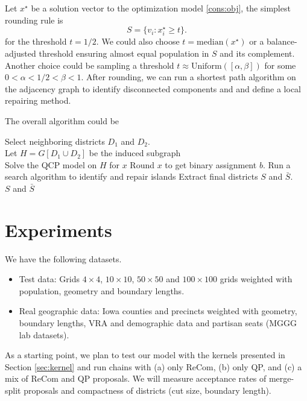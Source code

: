 \documentclass[11pt]{article}
\begin{document}
Let $x^\star$ be a solution vector to the optimization model \eqref{cons:obj}, the simplest rounding rule is
\[
    S = \{v_i : x^\star_i \ge t\}.
\]
for the threshold $t = 1/2$. We could also choose $t = \mathrm{median}(x^\star)$ or a balance-adjusted threshold ensuring almost equal population in $S$ and its complement. Another choice could be sampling a threshold $t \approx \text{Uniform}([\alpha, \beta])$ for some $0 < \alpha < 1/2 < \beta < 1$. After rounding, we can run a shortest path algorithm on the adjacency graph to identify disconnected components and and define a local repairing method.

The overall algorithm could be
\begin{algorithm}
\LinesNumbered
\caption{Outline of the Algorithm}\label{alg:overview}

\KwIn{}
\KwOut{}
\BlankLine


Select neighboring districts $D_1$ and $D_2$.  \\
Let $H = G[D_1 \cup D_2]$ be the induced subgraph \\
Solve the QCP model on $H$ for $x$   
Round $x$ to get binary assignment $b$. 
Run a search algorithm to identify and repair islands  
Extract final districts $S$ and $\bar S$. \\ 
\Return $S$ and $\bar S$
\end{algorithm}


\section{Experiments}\label{sec:experiments}

We have the following datasets.
\begin{itemize}
  \item Test data: Grids \(4\times4\), \(10\times10\), \(50\times50\) and \(100\times100\) grids weighted with population, geometry and boundary lengths.
  \item Real geographic data: Iowa counties and  precincts weighted with geometry, boundary lengths, VRA and demographic data and partisan seats (MGGG lab datasets).
\end{itemize}

As a starting point, we plan to test our model with the kernels presented in Section \ref{sec:kernel} and run chains with (a) only ReCom, (b) only QP, and (c) a mix of ReCom and QP proposals. We will measure acceptance rates of merge-split proposals and compactness of districts (cut size, boundary length).
\end{document}
